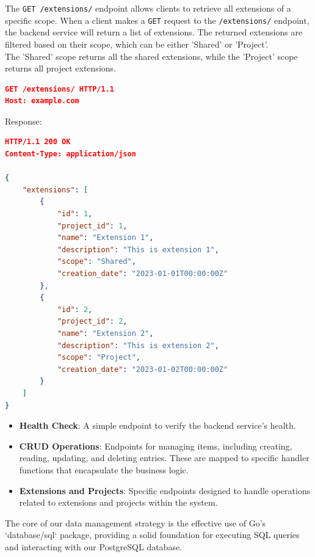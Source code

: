 
The \texttt{GET /extensions/} endpoint allows clients to retrieve all extensions of a specific scope.
When a client makes a \texttt{GET} request to the \texttt{/extensions/} endpoint, the backend service will return a list of extensions.
The returned extensions are filtered based on their scope, which can be either 'Shared' or 'Project'.
\\The 'Shared' scope returns all the shared extensions, while the 'Project' scope returns all project extensions.
\\
\begin{lstlisting}[language=json,label={lst:lstlisting13}]
GET /extensions/ HTTP/1.1
Host: example.com
\end{lstlisting}

Response:

\begin{lstlisting}[language=json,label={lst:lstlisting14}]
HTTP/1.1 200 OK
Content-Type: application/json

{
    "extensions": [
        {
            "id": 1,
            "project_id": 1,
            "name": "Extension 1",
            "description": "This is extension 1",
            "scope": "Shared",
            "creation_date": "2023-01-01T00:00:00Z"
        },
        {
            "id": 2,
            "project_id": 2,
            "name": "Extension 2",
            "description": "This is extension 2",
            "scope": "Project",
            "creation_date": "2023-01-02T00:00:00Z"
        }
    ]
}
\end{lstlisting}

\begin{itemize}
    \item \textbf{Health Check}: A simple endpoint to verify the backend service's health.
    \item \textbf{CRUD Operations}: Endpoints for managing items, including creating, reading, updating, and deleting entries.
    These are mapped to specific handler functions that encapsulate the business logic.
    \item \textbf{Extensions and Projects}: Specific endpoints designed to handle operations related to extensions and projects within the system.
\end{itemize}

The core of our data management strategy is the effective use of Go's `database/sql` package, providing a solid foundation for executing SQL queries and interacting with our PostgreSQL database.

